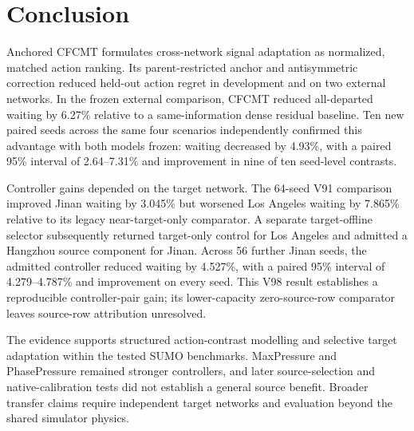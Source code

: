 \section{Conclusion}

Anchored CFCMT formulates cross-network signal adaptation as normalized,
matched action ranking.  Its parent-restricted anchor and antisymmetric
correction reduced held-out action regret in development and on two external
networks.  In the frozen external comparison, CFCMT reduced all-departed
waiting by 6.27\% relative to a same-information dense residual baseline.
Ten new paired seeds across the same four scenarios independently confirmed
this advantage with both models frozen: waiting decreased by 4.93\%, with a
paired 95\% interval of 2.64--7.31\% and improvement in nine of ten seed-level
contrasts.

Controller gains depended on the target network.  The 64-seed V91 comparison
improved Jinan waiting by 3.045\% but worsened Los Angeles waiting by 7.865\%
relative to its legacy near-target-only comparator.
A separate target-offline selector subsequently returned target-only control
for Los Angeles and admitted a Hangzhou source component for Jinan.
Across 56 further Jinan seeds, the admitted controller reduced waiting by
4.527\%, with a paired 95\% interval of 4.279--4.787\% and improvement on every
seed.  This V98 result establishes a reproducible controller-pair gain;
its lower-capacity zero-source-row comparator leaves source-row attribution
unresolved.

The evidence supports structured action-contrast modelling and selective
target adaptation within the tested SUMO benchmarks.
MaxPressure and PhasePressure remained stronger controllers, and later
source-selection and native-calibration tests did not establish a general
source benefit.  Broader transfer claims require independent target networks
and evaluation beyond the shared simulator physics.
